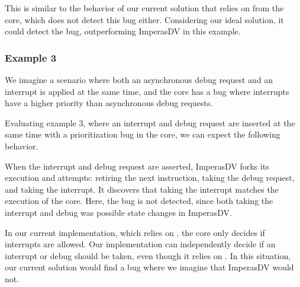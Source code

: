 This is similar to the behavior of our current solution that relies on  from the core, which does not detect this bug either. Considering our ideal solution, it could detect the bug, outperforming ImperasDV in this example.




\subsubsection{Example 3}

We imagine a scenario where both an asynchronous debug request and an interrupt is applied at the same time, and the core has a bug where interrupts have a higher priority than asynchronous debug requests.

Evaluating example 3, where an interrupt and debug request are inserted at the same time with a prioritization bug in the core, we can expect the following behavior.

When the interrupt and debug request are asserted, ImperasDV forks its execution and attempts: retiring the next instruction, taking the debug request, and taking the interrupt. It discovers that taking the interrupt matches the execution of the core. Here, the bug is not detected, since both taking the interrupt and debug was possible state changes in ImperasDV. 

In our current implementation, which relies on , the core only decides if interrupts are allowed. Our implementation can independently decide if an interrupt or debug should be taken, even though it relies on . In this situation, our current solution would find a bug where we imagine that ImperasDV would not. 


